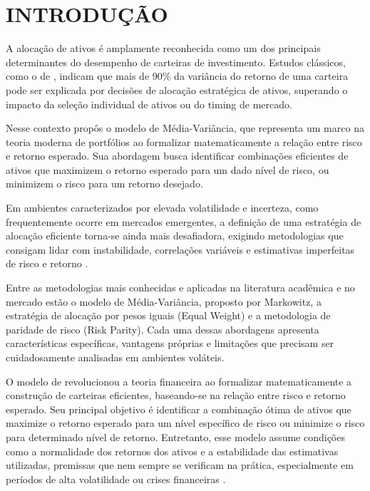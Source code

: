 
\chapter{INTRODUÇÃO}

A alocação de ativos é amplamente reconhecida como um dos principais determinantes do desempenho de carteiras de investimento. Estudos clássicos, como o de \cite{brinson1986determinants}, indicam que mais de 90\% da variância do retorno de uma carteira pode ser explicada por decisões de alocação estratégica de ativos, superando o impacto da seleção individual de ativos ou do timing de mercado.

Nesse contexto \cite{markowitz1952portfolio} propôs o modelo de Média-Variância, que representa um marco na teoria moderna de portfólios ao formalizar matematicamente a relação entre risco e retorno esperado. Sua abordagem busca identificar combinações eficientes de ativos que maximizem o retorno esperado para um dado nível de risco, ou minimizem o risco para um retorno desejado.

Em ambientes caracterizados por elevada volatilidade e incerteza, como frequentemente ocorre em mercados emergentes, a definição de uma estratégia de alocação eficiente torna-se ainda mais desafiadora, exigindo metodologias que consigam lidar com instabilidade, correlações variáveis e estimativas imperfeitas de risco e retorno \cite{ilmanen2022investing}.

Entre as metodologias mais conhecidas e aplicadas na literatura acadêmica e no mercado estão o modelo de Média-Variância, proposto por Markowitz, a estratégia de alocação por pesos iguais (Equal Weight) e a metodologia de paridade de risco (Risk Parity). Cada uma dessas abordagens apresenta características específicas, vantagens próprias e limitações que precisam ser cuidadosamente analisadas em ambientes voláteis.

O modelo de \cite{markowitz1952portfolio} revolucionou a teoria financeira ao formalizar matematicamente a construção de carteiras eficientes, baseando-se na relação entre risco e retorno esperado. Seu principal objetivo é identificar a combinação ótima de ativos que maximize o retorno esperado para um nível específico de risco ou minimize o risco para determinado nível de retorno. Entretanto, esse modelo assume condições como a normalidade dos retornos dos ativos e a estabilidade das estimativas utilizadas, premissas que nem sempre se verificam na prática, especialmente em períodos de alta volatilidade ou crises financeiras \cite{michalak2024equal}.

